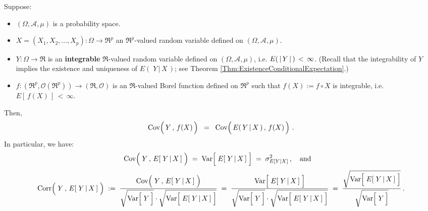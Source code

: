\begin{proposition}
\label{Propn:CovarianceYFX}
\mbox{}
\vskip 0.2cm
\noindent
Suppose:
\begin{itemize}
\item
	$(\Omega,\mathcal{A},\mu)$ is a probability space.
\item
	$X = (X_{1}, X_{2}, \ldots, X_{p}) : \Omega \longrightarrow \Re^{p}$ an $\Re^{p}$-valued random variable
	defined on $(\Omega,\mathcal{A},\mu)$.
\item
	$Y : \Omega \longrightarrow \Re$ is an \textbf{\color{red}integrable} $\Re$-valued random variable
	defined on $(\Omega,\mathcal{A},\mu)$,
	i.e. $E(\,\vert\,\overset{{\color{white}.}}{Y}\,\vert\,)\,<\,\infty$.
	\vskip 0.01cm
	(Recall that the integrability of $Y$ implies the existence and uniqueness of $E\!\left(\;Y\,\vert\,X\,\right)$;
	see Theorem \ref{Thm:ExistenceConditionalExpectation}.)
\item
	$f : (\Re^{p},\mathcal{O}(\Re^{p})) \longrightarrow (\Re,\mathcal{O})$ is an $\Re$-valued Borel function
	defined on $\Re^{p}$ such that $f(X) := f\circ X$ is integrable, i.e. $E\!\left[\,f(X)\,\right] \,<\, \infty$.
\end{itemize}
Then,
\begin{equation*}
\Cov\!\left(\,\overset{{\color{white}.}}{Y}\,,\,f(X)\,\right)
\;\; = \;\;
\Cov\!\left(\,\overset{{\color{white}.}}{E}(\,Y\,\vert\,X\,)\,,\,f(X)\,\right)\,.
\end{equation*}
In particular, we have:
\begin{equation*}
\Cov\!\left(\;\overset{{\color{white}.}}{Y}\,,\,E[\;Y\,\vert\,X\,]\;\right)
	\; = \; \Var\!\left[\;\overset{{\color{white}.}}{E}[\;Y\,\vert\,X\,]\;\right]
	\; = \; \sigma^{2}_{E[Y\vert X]}\,,
\quad\textnormal{and}\quad
\end{equation*}
\begin{equation*}
\Corr\!\left(\;\overset{{\color{white}.}}{Y}\,,\,E[\;Y\,\vert\,X\,]\;\right)
	\; := \;
		\dfrac{
			\Cov\!\left(\;\overset{{\color{white}.}}{Y}\,,\,E[\;Y\,\vert\,X\,]\;\right)
			}{
			\sqrt{\Var\!\left[\;\overset{{\color{white}.}}{Y}\,\right]} \cdot \sqrt{\Var\!\left[\;\overset{{\color{white}.}}{E}[\;Y\,\vert\,X\,]\;\right]}
			}
	\; = \;
		\dfrac{
			\Var\!\left[\;\overset{{\color{white}.}}{E}[\;Y\,\vert\,X\,]\;\right]
			}{
			\sqrt{\Var\!\left[\;\overset{{\color{white}.}}{Y}\,\right]} \cdot \sqrt{\Var\!\left[\;\overset{{\color{white}.}}{E}[\;Y\,\vert\,X\,]\;\right]}
			}
	\; = \;
		\dfrac{
			\sqrt{\Var\!\left[\;\overset{{\color{white}.}}{E}[\;Y\,\vert\,X\,]\;\right]}
			}{
			\sqrt{\Var\!\left[\;\overset{{\color{white}.}}{Y}\,\right]}
			}\,.
\end{equation*}
\end{proposition}
